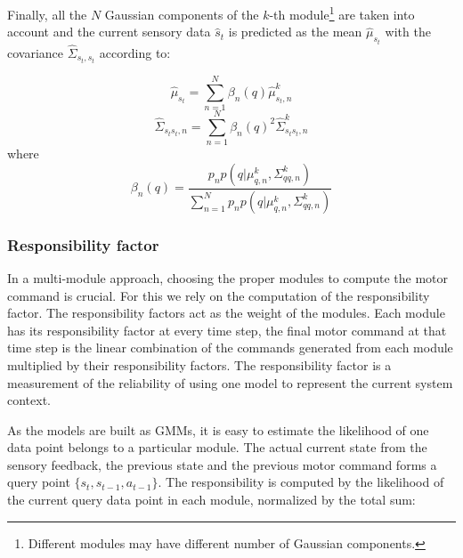 Finally, all the $N$ Gaussian components of the $k$-th module\footnote{Different modules may have different number of Gaussian components.} are taken into account and the current sensory data $\hat{s}_t$ is predicted as the mean $\hat{\mu}_{s_t}$ with the covariance $\hat{\Sigma}_{s_t,s_t}$ according to:

\begin{equation}
{
\hat{\mu}_{s_t} = \sum_{n=1}^N{\beta_n(q)}\hat{\mu}_{s_t,n}^k
}
\end{equation}
\begin{equation}
{
\hat{\Sigma}_{{s_t}{s_t},n} = \sum_{n=1}^N{\beta_n(q)}^2\hat{\Sigma}_{{s_t}{s_t},n}^k
}
\end{equation}
where
\begin{equation}
{
\beta_n(q) = \frac{p_{n}p(q|{\mu}_{q,n}^k,{\Sigma}_{qq,n}^k)}
{\sum_{n=1}^N{p_n}p(q|{\mu}_{q,n}^k,{\Sigma}_{qq,n}^k)}
}
\end{equation}



\subsubsection{Responsibility factor}
\label{sec:rf}

In a multi-module approach, choosing the proper modules to compute the motor command is crucial. For this we rely on the computation of the responsibility factor. The responsibility factors act as the weight of the modules. Each module has its responsibility factor at every time step, the final motor command at that time step is the linear combination of the commands generated from each module multiplied by their responsibility factors.
The responsibility factor is a measurement of the reliability of using one model to represent the current system context.
%
%

As the models are built as GMMs, it is easy to estimate the likelihood of one data point belongs to a particular module. The actual current state from the sensory feedback, the previous state and the previous motor command forms a query point $\{s_t,s_{t-1},a_{t-1}\}$. The responsibility is computed by the likelihood of the current query data point in each module, normalized by the total sum:

